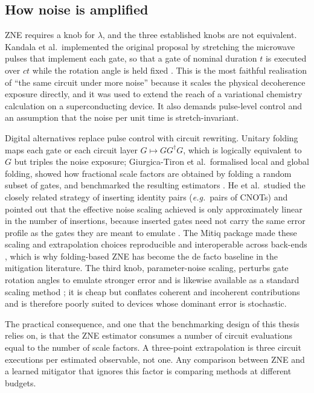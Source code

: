 \documentclass[Thesis.tex]{subfiles}
\begin{document}
\subsection{How noise is amplified}\label{sec:ch2_noise_amplification}

ZNE requires a knob for $\lambda$, and the three established knobs are not
equivalent. Kandala et al.\ implemented the original proposal by stretching
the microwave pulses that implement each gate, so that a gate of nominal
duration $t$ is executed over $ct$ while the rotation angle is held fixed
\cite{kandala2019extends}. This is the most faithful realisation of
``the same circuit under more noise'' because it scales the physical
decoherence exposure directly, and it was used to extend the reach of a
variational chemistry calculation on a superconducting device. It also demands
pulse-level control and an assumption that the noise per unit time is
stretch-invariant.

Digital alternatives replace pulse control with circuit rewriting.
Unitary folding maps each gate or each circuit layer $G \mapsto G G^{\dagger}
G$, which is logically equivalent to $G$ but triples the noise exposure;
Giurgica-Tiron et al.\ formalised local and global folding, showed how
fractional scale factors are obtained by folding a random subset of gates, and
benchmarked the resulting estimators \cite{giurgicatiron2020digital}. He et
al.\ studied the closely related strategy of inserting identity pairs
(\textit{e.g.}\ pairs of CNOTs) and pointed out that the effective noise
scaling achieved is only approximately linear in the number of insertions,
because inserted gates need not carry the same error profile as the gates they
are meant to emulate \cite{he2020zero}. The Mitiq package made these
scaling and extrapolation choices reproducible and interoperable across
back-ends \cite{larose2022mitiq}, which is why folding-based ZNE has become the
de facto baseline in the mitigation literature. The third knob, parameter-noise
scaling, perturbs gate rotation angles to emulate stronger error and is
likewise available as a standard scaling method \cite{larose2022mitiq}; it is
cheap but conflates coherent and incoherent contributions and is therefore
poorly suited to devices whose dominant error is stochastic.

The practical consequence, and one that the benchmarking design of this thesis
relies on, is that the ZNE estimator consumes a number of circuit evaluations
equal to the number of scale factors. A three-point extrapolation is three
circuit executions per estimated observable, not one. Any comparison between
ZNE and a learned mitigator that ignores this factor is comparing methods at
different budgets.
\end{document}

